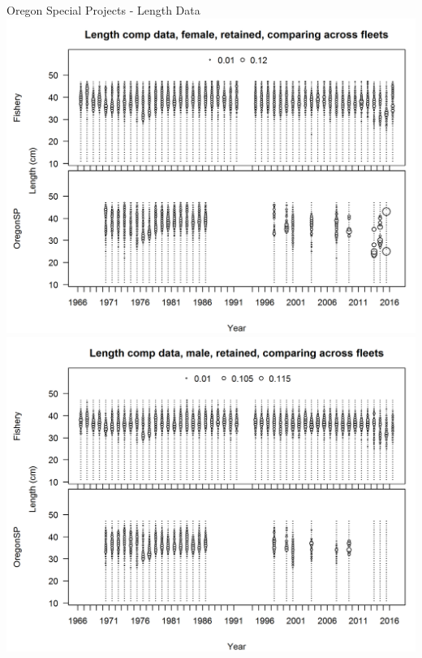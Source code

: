 \documentclass[pdf]{beamer}\usepackage[]{graphicx}\usepackage[]{color}
\begin{document}
\begin{frame}{Oregon Special Projects - Length Data}
  \includegraphics[scale = 0.37]{figures/OR_sp_lencomps_female.png}
  \includegraphics[scale = 0.37]{figures/OR_sp_lencomps_male.png}
\end{frame}
\end{document}
